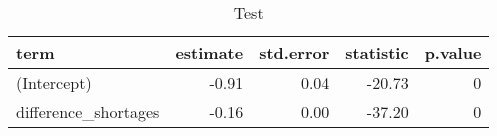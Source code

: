 \begin{table}

\caption{\label{tab:}Test}
\centering
\begin{tabular}[t]{lrrrr}
\toprule
term & estimate & std.error & statistic & p.value\\
\midrule
(Intercept) & -0.91 & 0.04 & -20.73 & 0\\
difference\_shortages & -0.16 & 0.00 & -37.20 & 0\\
\bottomrule
\end{tabular}
\end{table}
